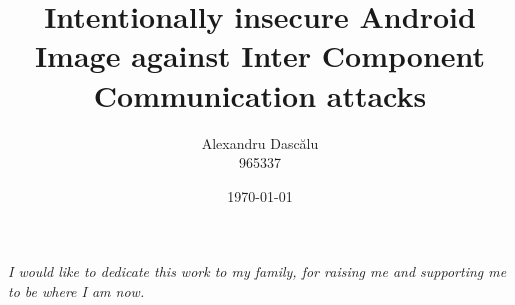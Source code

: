 \documentclass[11pt, a4paper, twoside, openany]{custard}
\begin{document}
	
	\title{Intentionally insecure Android Image against Inter Component Communication attacks}
	\author{Alexandru Dascălu\protect\\{\normalsize 965337}}
	
	
	
	\date{\today}
	
	\frontmatter%
	\maketitle
	\declaration
	\cleardoublepage
	
	\begin{vplace}[0.7]
		\begin{large}
			\begin{center}
				\textit{I would like to dedicate this work to my family, for raising me and supporting me to be where I am now.}
			\end{center}
		\end{large}
	\end{vplace}
\end{document}
